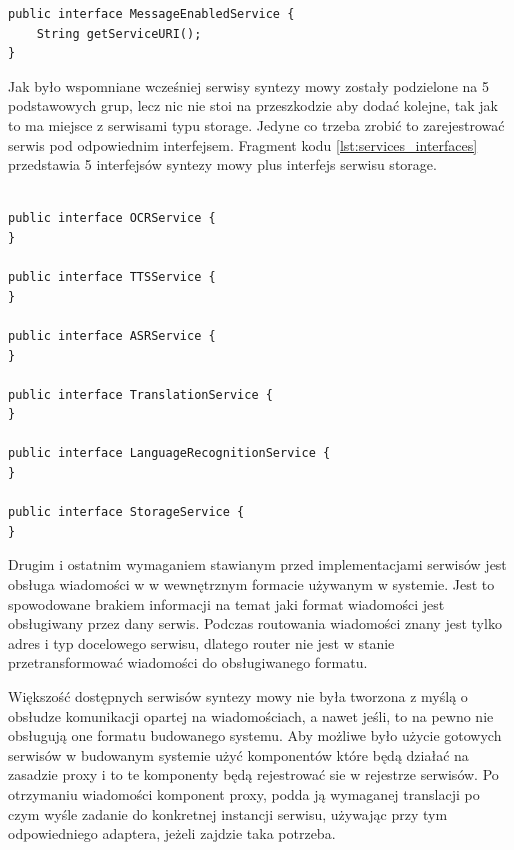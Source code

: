 \lstset{language=Java, tabsize=4, caption=Definicja interfejsu IMessageEnabledService w języku Java.,label=lst:service_interface}

\begin{center}
\begin{lstlisting}
public interface MessageEnabledService {
	String getServiceURI();
}
\end{lstlisting}
\end{center}

Jak było wspomniane wcześniej serwisy syntezy mowy zostały podzielone na 5 podstawowych grup, lecz nic nie stoi na przeszkodzie aby dodać kolejne, tak jak to ma miejsce z serwisami typu storage. Jedyne co trzeba zrobić to zarejestrować serwis pod odpowiednim interfejsem. Fragment kodu \ref{lst:services_interfaces} przedstawia 5 interfejsów syntezy mowy plus interfejs serwisu storage.

\lstset{language=Java, tabsize=4, caption=Definicja interfejsów serwisów w języku Java.,label=lst:services_interfaces}

\begin{center}
\begin{lstlisting}

public interface OCRService {
}

public interface TTSService {
}

public interface ASRService {
}

public interface TranslationService {
}

public interface LanguageRecognitionService {
}

public interface StorageService {
}
\end{lstlisting}
\end{center}

Drugim i ostatnim wymaganiem stawianym przed implementacjami serwisów jest obsługa wiadomości w w wewnętrznym formacie używanym w systemie. Jest to spowodowane brakiem informacji na temat jaki format wiadomości jest obsługiwany przez dany serwis. Podczas routowania wiadomości znany jest tylko adres i typ docelowego serwisu, dlatego router nie jest w stanie przetransformować wiadomości do obsługiwanego formatu. 


Większość dostępnych serwisów syntezy mowy nie była tworzona z myślą o obsłudze komunikacji opartej na wiadomościach, a nawet jeśli,  to na pewno nie obsługują one formatu budowanego systemu. Aby możliwe było użycie gotowych serwisów w budowanym systemie użyć komponentów które będą działać na zasadzie proxy i to te komponenty będą rejestrować sie w rejestrze serwisów. Po otrzymaniu wiadomości komponent proxy, podda ją wymaganej translacji po czym wyśle zadanie do konkretnej instancji serwisu, używając przy tym odpowiedniego adaptera, jeżeli zajdzie taka potrzeba. 

